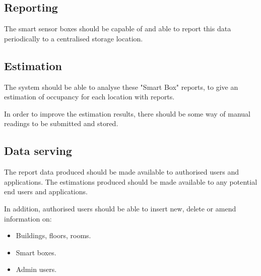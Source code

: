 \documentclass{l4proj}
\begin{document}
\subsection{Reporting}
The smart sensor boxes should be capable of and able to report this data periodically to a centralised storage location.

\subsection{Estimation}
The system should be able to analyse these "Smart Box" reports, to give an estimation of occupancy for each location with reports.

In order to improve the estimation results, there should be some way of manual readings to be submitted and stored.

\subsection{Data serving}
The report data produced should be made available to authorised users and applications.
The estimations produced should be made available to any potential end users and applications.

In addition, authorised users should be able to insert new, delete or amend information on:
\begin{itemize}  
  \item Buildings, floors, rooms.
  \item Smart boxes.
  \item Admin users.
\end{itemize}
\end{document}
